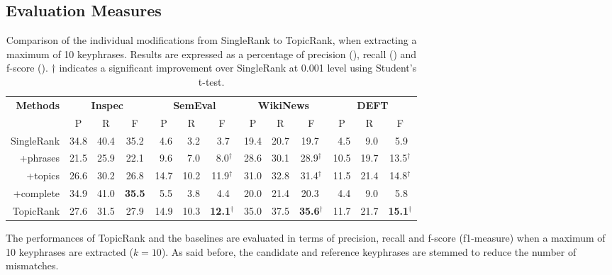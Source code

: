   \subsection{Evaluation Measures}
  \label{subsec:measures}
    \begin{table}
      \centering
      \begin{tabular}{@{ }rcccccccccccc@{ }}
        \toprule
        \multirow{2}{*}[-2pt]{\textbf{Methods}} & \multicolumn{3}{c}{\textbf{Inspec}} & \multicolumn{3}{c}{\textbf{SemEval}} & \multicolumn{3}{c}{\textbf{WikiNews}} & \multicolumn{3}{c}{\textbf{DEFT}}\\
        \cmidrule(lr){2-4}\cmidrule(lr){5-7}\cmidrule(lr){8-10}\cmidrule(l){11-13}
        & P & R & F & P & R & F & P & R & F & P & R & F\\
        \midrule
        SingleRank & 34.8 & 40.4 & 35.2 & $~~$4.6 & $~~$3.2 & $~~$3.7$^{~}$ & 19.4 & 20.7 & 19.7$^{~}$ & $~~$4.5 & $~~$9.0 & $~~$5.9$^{~}$\\
        +phrases & 21.5 & 25.9 & 22.1 & $~~$9.6 & $~~$7.0 & $~~$8.0$^\dagger$ & 28.6 & 30.1 & 28.9$^\dagger$ & 10.5 & 19.7 & 13.5$^\dagger$\\
        +topics & 26.6 & 30.2 & 26.8 & 14.7 & 10.2 & 11.9$^\dagger$ & 31.0 & 32.8 & 31.4$^\dagger$ & 11.5 & 21.4 & 14.8$^\dagger$\\
        +complete & 34.9 & 41.0 & \textbf{35.5} & $~~$5.5 & $~~$3.8 & $~~$4.4$^{~}$ & 20.0 & 21.4 & 20.3${~}$ & $~~$4.4 & $~~$9.0 & $~~$5.8$^{~}$\\
        TopicRank & 27.6 & 31.5 & 27.9  & 14.9 & 10.3 & \textbf{12.1}$^\dagger$ & 35.0 & 37.5 & \textbf{35.6}$^\dagger$ & 11.7 & 21.7 & \textbf{15.1}$^\dagger$\\
        \bottomrule
      \end{tabular}
      \caption{Comparison of the individual modifications from SingleRank to
               TopicRank, when extracting a maximum of 10 keyphrases. Results
               are expressed as a percentage of precision (), recall
               () and f-score (). $\dagger$ indicates a
               significant improvement over SingleRank at 0.001 level using
               Student's t-test.
               \label{tab:singlerank_improvements}}
    \end{table}

    The performances of TopicRank and the baselines are evaluated in terms of
    precision, recall and f-score (f1-measure) when a maximum of 10 keyphrases
    are extracted ($k = 10$). As said before, the candidate and reference
    keyphrases are stemmed to reduce the number of mismatches.

